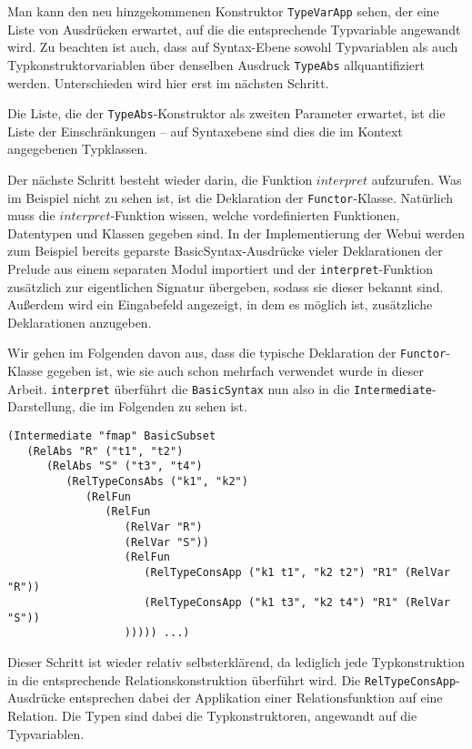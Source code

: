 Man kann den neu hinzgekommenen Konstruktor \texttt{TypeVarApp} sehen, der eine Liste von Ausdrücken erwartet, auf
die die entsprechende Typvariable angewandt wird. Zu beachten ist auch, dass auf Syntax-Ebene sowohl Typvariablen als auch
Typkonstruktorvariablen über denselben Ausdruck \texttt{TypeAbs} allquantifiziert werden. Unterschieden wird hier erst im
nächsten Schritt.

Die Liste, die der \texttt{TypeAbs}-Konstruktor als zweiten Parameter erwartet, ist die Liste der Einschränkungen -- auf Syntaxebene
sind dies die im Kontext angegebenen Typklassen.

Der nächste Schritt besteht wieder darin, die Funktion $interpret$ aufzurufen. Was im Beispiel nicht zu sehen ist, ist die
Deklaration der \texttt{Functor}-Klasse. Natürlich muss die $interpret$-Funktion wissen, welche vordefinierten Funktionen,
Datentypen und Klassen gegeben sind. In der Implementierung der Webui \cite{freetheoremswebui} werden zum Beispiel bereits
geparste BasicSyntax-Ausdrücke vieler Deklarationen der Prelude aus einem separaten Modul importiert und der
\texttt{interpret}-Funktion zusätzlich zur eigentlichen Signatur übergeben, sodass sie dieser bekannt sind.
Außerdem wird ein Eingabefeld angezeigt, in dem es möglich ist, zusätzliche Deklarationen anzugeben.

Wir gehen im Folgenden davon aus, dass die typische Deklaration der \texttt{Functor}-Klasse gegeben ist, wie sie auch schon
mehrfach verwendet wurde in dieser Arbeit.  \texttt{interpret} überführt die \texttt{BasicSyntax} nun also in die
\texttt{Intermediate}-Darstellung, die im Folgenden zu sehen ist.

\begin{verbatim}
(Intermediate "fmap" BasicSubset
   (RelAbs "R" ("t1", "t2")
      (RelAbs "S" ("t3", "t4")
         (RelTypeConsAbs ("k1", "k2")
            (RelFun
               (RelFun
                  (RelVar "R")
                  (RelVar "S"))
                  (RelFun
                     (RelTypeConsApp ("k1 t1", "k2 t2") "R1" (RelVar "R"))
                     (RelTypeConsApp ("k1 t3", "k2 t4") "R1" (RelVar "S"))
                  ))))) ...)
\end{verbatim}

Dieser Schritt ist wieder relativ selbsterklärend, da lediglich jede Typkonstruktion in die entsprechende Relationskonstruktion
überführt wird. Die \texttt{RelTypeConsApp}-Ausdrücke entsprechen dabei der Applikation einer Relationsfunktion auf
eine Relation. Die Typen sind dabei die Typkonstruktoren, angewandt auf die Typvariablen.

